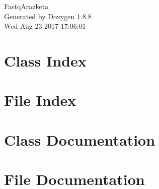 \documentclass[twoside]{book}
\newcommand{\+}{\discretionary{\mbox{\scriptsize$\hookleftarrow$}}{}{}}
\newcommand{\clearemptydoublepage}{%
  \newpage{\pagestyle{empty}\cleardoublepage}%
}
\begin{document}
\hypersetup{pageanchor=false,
             bookmarks=true,
             bookmarksnumbered=true,
             pdfencoding=unicode
            }
\begin{titlepage}
\vspace*{7cm}
\begin{center}%
{\Large Fastq\+Arazketa }\\
\vspace*{1cm}
{\large Generated by Doxygen 1.8.8}\\
\vspace*{0.5cm}
{\small Wed Aug 23 2017 17:06:01}\\
\end{center}
\end{titlepage}
\clearemptydoublepage
\tableofcontents
\clearemptydoublepage
{}
\hypersetup{pageanchor=true}

\chapter{Class Index}

\chapter{File Index}

\chapter{Class Documentation}









\chapter{File Documentation}




























\newpage
{}
{}
\printindex
\end{document}

